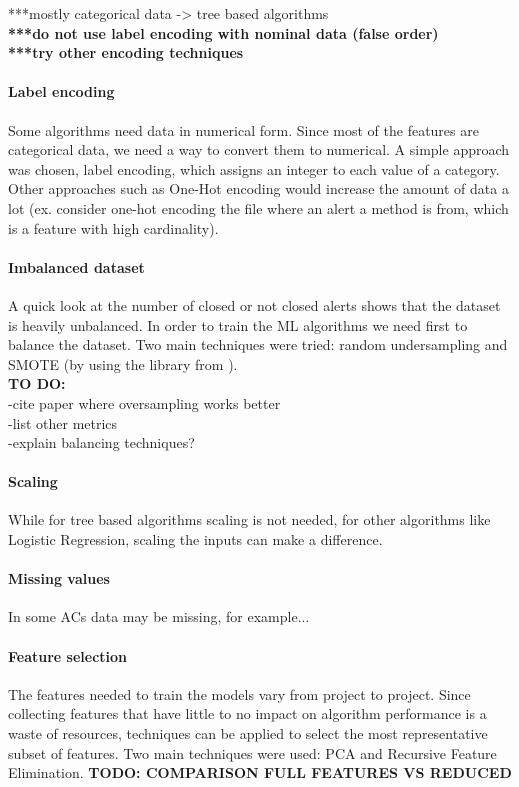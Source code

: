 \documentclass{article}
\begin{document}
***mostly categorical data -> tree based algorithms\\
\textbf{***do not use label encoding with nominal data (false order)}\\
\textbf{***try other encoding techniques}

\paragraph{Label encoding} Some algorithms need data in numerical form. Since most of the features are categorical data, we need a way to convert them to numerical. A simple approach was chosen, label encoding, which assigns an integer to each value of a category. Other approaches such as One-Hot encoding would increase the amount of data a lot (ex. consider one-hot encoding the file where an alert a method is from, which is a feature with high cardinality).

\paragraph{Imbalanced dataset} A quick look at the number of closed or not closed alerts shows that the dataset is heavily unbalanced. In order to train the ML algorithms we need first to balance the dataset. Two main techniques were tried: random undersampling and SMOTE (by using the library from \cite{imblearn}).\\

\textbf{TO DO:}\\
-cite paper where oversampling works better\\
-list other metrics\\
-explain balancing techniques?

\paragraph{Scaling} While for tree based algorithms scaling is not needed, for other algorithms like Logistic Regression, scaling the inputs can make a difference.

\paragraph{Missing values} In some ACs data may be missing, for example...

\paragraph{Feature selection} The features needed to train the models vary from project to project. Since collecting features that have little to no impact on algorithm performance is a waste of resources, techniques can be applied to select the most representative subset of features. Two main techniques were used: PCA and Recursive Feature Elimination.
\textbf{TODO: COMPARISON FULL FEATURES VS REDUCED}
\end{document}
